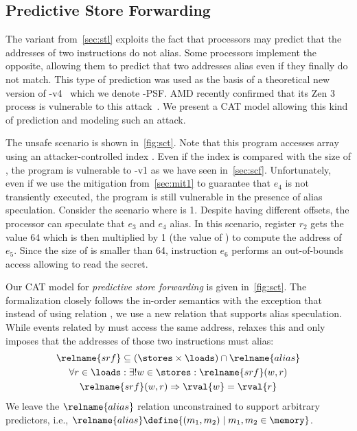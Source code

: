 \documentclass[conference]{IEEEtran}
\begin{document}
\subsection{Predictive Store Forwarding}
\label{sec:sct}

The \spectre variant from~\autoref{sec:stl} exploits the fact that processors may predict that the addresses of two instructions do not alias.
Some processors implement the opposite, allowing them to predict that two addresses alias even if they finally do not match.
This type of prediction was used as the basis of a theoretical new version of \spectre-v4~\cite{CauligiDGTSRB20,GuancialeBD20} which we denote \spectre-\textsc{PSF}.
AMD recently confirmed that its Zen 3 process is vulnerable to this attack~\cite{amd-sec2}. 
We present a CAT model allowing this kind of prediction and modeling such an attack.

The unsafe scenario is shown in~\autoref{fig:sct}.
Note that this program accesses array \varC using an attacker-controlled index \varidx.
Even if the index is compared with the size of \varC, the program is vulnerable to \spectre-v1 as we have seen in~\autoref{sec:scf}.
Unfortunately, even if we use the mitigation from~\autoref{sec:mit1} to guarantee that $e_4$ is not transiently executed, the program is still vulnerable in the presence of alias speculation.
Consider the scenario where \varidx is 1.
Despite having different offsets, the processor can speculate that $e_3$ and $e_4$ alias.
In this scenario, register $r_2$ gets the value 64 which is then multiplied by 1 (the value of \varidx) to compute the address of $e_5$.
Since the size of \varA is smaller than 64, instruction $e_6$ performs an out-of-bounds access allowing to read the secret.

Our CAT model for \emph{predictive store forwarding} is given in~\autoref{fig:sct}.
The formalization closely follows the in-order semantics with the exception that instead of using relation , we use a new relation that supports alias speculation.
While events related by  must access the same address,  relaxes this and only imposes that the addresses of those two instructions must alias: 
\begin{gather*}
\relname{srf} \subseteq (\stores \times \loads) \cap \relname{alias} \\ 
\forall r \in \loads : {\exists! w \in \stores : {\relname{srf}(w,r)}} \\
\relname{srf}(w,r) \Rightarrow \rval{w} = \rval{r}
\end{gather*}
\noindent
We leave the $\relname{alias}$ relation unconstrained to support arbitrary predictors, i.e., $\relname{alias} \define \{ (m_1,m_2) \mid m_1,m_2 \in \memory \}$.
\end{document}
